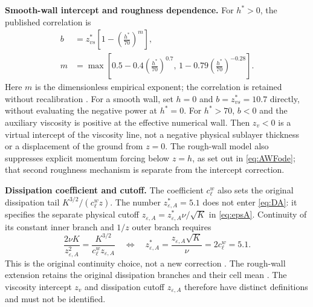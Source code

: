 \documentclass[11pt,a4paper]{article}
\numberwithin{equation}{section}
\newcommand{\eps}{\varepsilon}
\begin{document}
\textbf{Smooth-wall intercept and roughness dependence.}
For $h^*>0$, the published correlation is
\begin{equation}
 \begin{aligned}
 b&=z_{vs}^*\left[1-\left(\frac{h^*}{70}\right)^m\right],\\
 m&=\max\left[
 0.5-0.4\left(\frac{h^*}{70}\right)^{0.7},\,
 1-0.79\left(\frac{h^*}{70}\right)^{-0.28}\right].
 \end{aligned}
 \label{eq:brough}
\end{equation}
Here $m$ is the dimensionless empirical exponent; the correlation is
retained without recalibration \cite[Eqs.~(24)--(25)]{SCI2006}.
For a smooth wall, set $h=0$ and $b=z_{vs}^*=10.7$ directly, without
evaluating the negative power at $h^*=0$. For $h^*>70$, $b<0$ and the
auxiliary viscosity is positive at the effective numerical wall.
Then $z_v<0$ is a virtual intercept of the viscosity line, not a negative
physical sublayer thickness or a displacement of the ground from $z=0$.
The rough-wall model also suppresses explicit momentum forcing below
$z=h$, as set out in \cref{eq:AWFode}; that second roughness mechanism
is separate from the intercept correction.

\textbf{Dissipation coefficient and cutoff.}
The coefficient $c_\ell^w$ also sets the original dissipation tail
$K^{3/2}/(c_\ell^w z)$. The number $z_{\eps,A}^*=5.1$ does not enter
\cref{eq:DA}: it specifies the separate physical cutoff
$z_{\eps,A}=z_{\eps,A}^*\nu/\sqrt K$ in \cref{eq:epsA}.
Continuity of its constant inner branch and $1/z$ outer branch requires
\begin{equation}
 \frac{2\nu K}{z_{\eps,A}^2}
 =\frac{K^{3/2}}{c_\ell^w z_{\eps,A}}
 \quad\Longleftrightarrow\quad
 z_{\eps,A}^*=\frac{z_{\eps,A}\sqrt K}{\nu}=2c_\ell^w=5.1.
 \label{eq:awf_cutoff_continuity}
\end{equation}
This is the original continuity choice, not a new correction
\cite[Eq.~(20) and the text following it]{SCI2006}. The rough-wall
extension retains the original dissipation branches and their cell mean
\cite[Eqs.~(20)--(21), discussion before Table~2]{SCI2006}.
The viscosity intercept $z_v$ and dissipation cutoff $z_{\eps,A}$ therefore
have distinct definitions and must not be identified.
\end{document}
